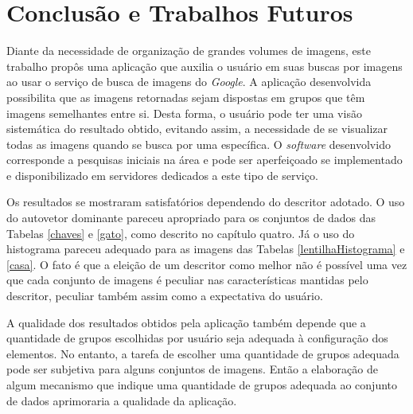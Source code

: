 \chapter{Conclusão e Trabalhos Futuros}

Diante da necessidade de organização de grandes volumes de imagens, este trabalho propôs uma aplicação que auxilia o usuário em suas buscas por imagens ao usar o serviço de busca de imagens do \emph{Google}. A aplicação desenvolvida possibilita que as imagens retornadas sejam dispostas em grupos que têm imagens semelhantes entre si. Desta forma, o usuário pode ter uma visão sistemática do resultado obtido, evitando assim, a necessidade de se visualizar todas as imagens quando se busca por uma específica.
O \textit{software} desenvolvido corresponde a pesquisas iniciais na área e pode ser aperfeiçoado se implementado e disponibilizado em servidores dedicados a este tipo de serviço. 


\begin{comment}
No processo de geração dos descritores, a aplicação pode levar cerca de trinta segundos dependendo das configurações físicas da máquina em uso. O fato é que este processo itera por todos os \emph{pixels} de todas as imagens de entrada e para isso ainda é preciso desenhar a imagem no componente \emph{canvas}. Por estas razões a etapa de geração de descritores pode gastar cerca de trinta segundos. 

O tempo de execução da aplicação pode ser melhorado com a implementação do algoritmo em uma linguagem compilada como C/C++. Outra alternativa para melhorar o tempo de execução seria executar o algoritmo no ambiente do servidor onde as imagens estão disponíveis, desta forma o uso do componentes \emph{canvas} não seria mais necessário. Bibliotecas para manipulação 
\end{comment}

Os resultados se mostraram satisfatórios dependendo do descritor adotado. O uso do autovetor dominante pareceu apropriado para os conjuntos de dados das Tabelas \ref{chaves} e \ref{gato}, como descrito no capítulo quatro. Já o uso do histograma pareceu adequado para as imagens das Tabelas \ref{lentilhaHistograma} e \ref{casa}. O fato é que a eleição de um descritor como melhor não é possível uma vez que cada conjunto de imagens é peculiar nas características mantidas pelo descritor, peculiar também assim como a expectativa do usuário.

A qualidade dos resultados obtidos pela aplicação também depende que a quantidade de grupos escolhidas por usuário seja adequada à configuração dos elementos. No entanto, a tarefa de escolher uma quantidade de grupos adequada pode ser subjetiva para alguns conjuntos de imagens. Então a elaboração de algum mecanismo que indique uma quantidade de grupos adequada ao conjunto de dados aprimoraria a qualidade da aplicação.


